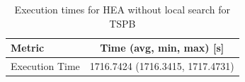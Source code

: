 \begin{table}[h!]
\centering
\begin{tabular}{lc}
\hline
Metric & Time (avg, min, max) [s] \\
\hline
Execution Time & 1716.7424 (1716.3415, 1717.4731) \\
\hline
\end{tabular}
\caption{Execution times for HEA without local search for TSPB}
\label{tab:TSPB_hea_without_ls_timings}
\end{table}
